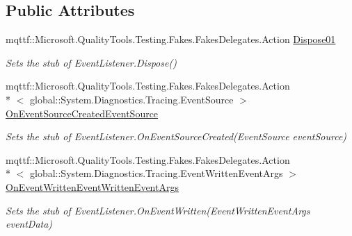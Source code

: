 \subsection*{Public Attributes}
\begin{DoxyCompactItemize}
\item 
mqttf\-::\-Microsoft.\-Quality\-Tools.\-Testing.\-Fakes.\-Fakes\-Delegates.\-Action \hyperlink{class_system_1_1_diagnostics_1_1_tracing_1_1_fakes_1_1_stub_event_listener_a5a3f4c2b77216b4e662b1c1b4ec745bd}{Dispose01}
\begin{DoxyCompactList}\small\item\em Sets the stub of Event\-Listener.\-Dispose()\end{DoxyCompactList}\item 
mqttf\-::\-Microsoft.\-Quality\-Tools.\-Testing.\-Fakes.\-Fakes\-Delegates.\-Action\\*
$<$ global\-::\-System.\-Diagnostics.\-Tracing.\-Event\-Source $>$ \hyperlink{class_system_1_1_diagnostics_1_1_tracing_1_1_fakes_1_1_stub_event_listener_a54d2793e91ce1ecec46b0b5e0c01ad85}{On\-Event\-Source\-Created\-Event\-Source}
\begin{DoxyCompactList}\small\item\em Sets the stub of Event\-Listener.\-On\-Event\-Source\-Created(\-Event\-Source event\-Source)\end{DoxyCompactList}\item 
mqttf\-::\-Microsoft.\-Quality\-Tools.\-Testing.\-Fakes.\-Fakes\-Delegates.\-Action\\*
$<$ global\-::\-System.\-Diagnostics.\-Tracing.\-Event\-Written\-Event\-Args $>$ \hyperlink{class_system_1_1_diagnostics_1_1_tracing_1_1_fakes_1_1_stub_event_listener_a8977191cdbe3e926ec9325dfc6e41de7}{On\-Event\-Written\-Event\-Written\-Event\-Args}
\begin{DoxyCompactList}\small\item\em Sets the stub of Event\-Listener.\-On\-Event\-Written(\-Event\-Written\-Event\-Args event\-Data)\end{DoxyCompactList}\end{DoxyCompactItemize}
